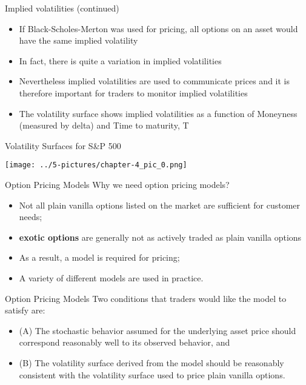 \documentclass[11pt]{beamer}
\begin{document}
\begin{frame}{Implied volatilities (continued)}
	\begin{itemize}
		\item If Black-Scholes-Merton was used for pricing, all options on an asset would have the same implied volatility
		\item In fact, there is quite a variation in implied volatilities
		\item Nevertheless implied volatilities are used to communicate prices and it is therefore important for traders to monitor implied volatilities
		\item The volatility surface shows implied volatilities as a function of Moneyness (measured by delta) and Time to maturity, T
	\end{itemize}
\end{frame}
\begin{frame}{Volatility Surfaces for S\&P 500 }
	\begin{center}
	\texttt{[image: ../5-pictures/chapter-4\_pic\_0.png]}
	\end{center}
\end{frame}
\begin{frame}{Option Pricing Models}
Why we need option pricing models?
	\begin{itemize}
		\item Not all plain vanilla options listed on the market are sufficient for customer needs;
		\item \textbf{exotic options} are generally not as actively traded as plain vanilla options
		\item As a result, a
model is required for pricing;
\item A variety of different models are used in practice.
	\end{itemize}
\end{frame}
\begin{frame}{Option Pricing Models}
Two conditions that traders would like the model to satisfy are:

	\begin{itemize}
\item (A) The stochastic behavior assumed for the underlying asset price should correspond reasonably well to its observed behavior, and

\item (B) The volatility surface derived from the model should be reasonably consistent with the volatility surface used to price plain vanilla options.
	\end{itemize}
\end{frame}
\end{document}
